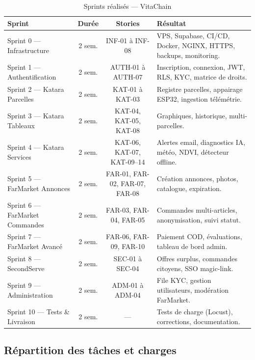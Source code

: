 \documentclass[12pt,a4paper]{report}
\begin{document}
\begin{table}[H]
  \centering
  \caption{Sprints réalisés --- VitaChain}
  \label{tab:sprints}
  \small
  \begin{tabularx}{\linewidth}{lccX}
    \toprule
    \textbf{Sprint} & \textbf{Durée} & \textbf{Stories} & \textbf{Résultat} \\
    \midrule
    Sprint 0 --- Infrastructure & 2 sem. & INF-01 à INF-08
      & VPS, Supabase, CI/CD, Docker, NGINX, HTTPS, backups, monitoring. \\
    Sprint 1 --- Authentification & 2 sem. & AUTH-01 à AUTH-07
      & Inscription, connexion, JWT, RLS, KYC, matrice de droits. \\
    Sprint 2 --- Katara Parcelles & 2 sem. & KAT-01 à KAT-03
      & Registre parcelles, appairage ESP32, ingestion télémétrie. \\
    Sprint 3 --- Katara Tableaux & 2 sem. & KAT-04, KAT-05, KAT-08
      & Graphiques, historique, multi-parcelles. \\
    Sprint 4 --- Katara Services & 2 sem. & KAT-06, KAT-07, KAT-09--14
      & Alertes email, diagnostics IA, météo, NDVI, détecteur offline. \\
    Sprint 5 --- FarMarket Annonces & 2 sem. & FAR-01, FAR-02, FAR-07, FAR-08
      & Création annonces, photos, catalogue, expiration. \\
    Sprint 6 --- FarMarket Commandes & 2 sem. & FAR-03, FAR-04, FAR-05
      & Commandes multi-articles, anonymisation, suivi statut. \\
    Sprint 7 --- FarMarket Avancé & 2 sem. & FAR-06, FAR-09, FAR-10
      & Paiement COD, évaluations, tableau de bord admin. \\
    Sprint 8 --- SecondServe & 2 sem. & SEC-01 à SEC-04
      & Offres surplus, commandes citoyens, SSO magic-link. \\
    Sprint 9 --- Administration & 2 sem. & ADM-01 à ADM-04
      & File KYC, gestion utilisateurs, modération FarMarket. \\
    Sprint 10 --- Tests \& Livraison & 2 sem. & ---
      & Tests de charge (Locust), corrections, documentation. \\
    \bottomrule
  \end{tabularx}
\end{table}

\subsection{Répartition des tâches et charges}
\end{document}
